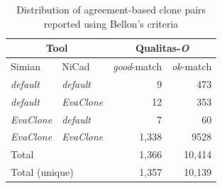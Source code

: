\documentclass{sig-alternate-05-2015}
\begin{document}
\begin{table}
	\centering
	\caption{Distribution of agreement-based clone pairs reported using Bellon's criteria}
	\label{t_agreed_good_clone_pairs}
	\begin{tabular}{l|l|r|r}
		\hline
		\multicolumn{2}{c|}{Tool} & \multicolumn{2}{c}{Qualitas-\textit{O}} \\
		\hline
		Simian & NiCad & \textit{good}-match & \textit{ok}-match \\
		\hline
		\textit{default} & \textit{default} & 9 	& 473 \\ 
		\textit{default} & \textit{EvaClone} 	& 12 	& 353 \\ 
		\textit{EvaClone} 	& \textit{default} 	& 7 	& 60 \\
		\textit{EvaClone} 	& \textit{EvaClone} 	& 1,338 & 9528 \\ 
		\hline
		\multicolumn{2}{l|}{Total} & 1,366 & 10,414 \\
		\multicolumn{2}{l|}{Total (unique)} & 1,357 & 10,139 \\
		\hline
	\end{tabular}
\end{table}
\end{document}

